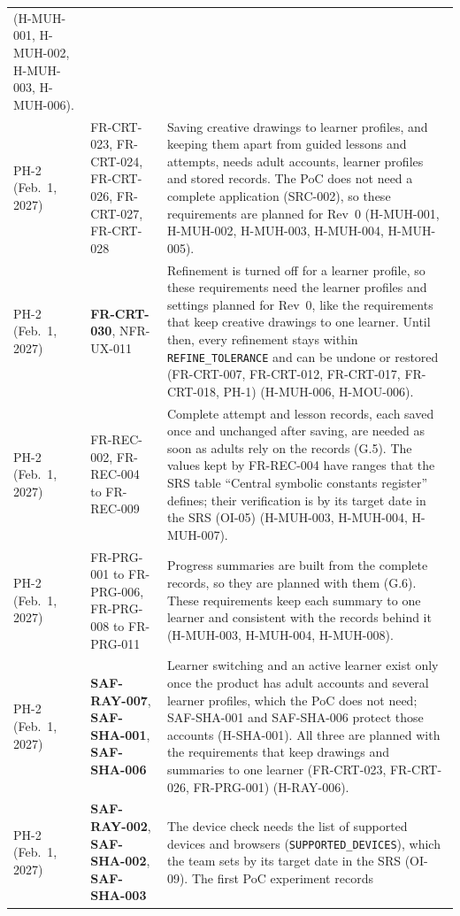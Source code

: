 \documentclass{article}
\begin{document}
{\begin{longtable}{@{}
  >{\raggedright\arraybackslash}p{1.7cm} >{\raggedright\arraybackslash}p{2.4cm}
  >{\raggedright\arraybackslash}p{\dimexpr\linewidth-4.1cm-4\tabcolsep\relax}
  @{}}
(H-MUH-001, H-MUH-002, H-MUH-003, H-MUH-006). \\
\addlinespace
PH-2 (Feb.~1, 2027) & FR-CRT-023, FR-CRT-024, FR-CRT-026, FR-CRT-027, FR-CRT-028
& Saving creative drawings to learner profiles, and keeping them apart from
guided lessons and attempts, needs adult accounts, learner profiles and stored
records. The PoC does not need a complete application (SRC-002), so these
requirements are planned for Rev~0 (H-MUH-001, H-MUH-002, H-MUH-003, H-MUH-004,
H-MUH-005). \\
\addlinespace
PH-2 (Feb.~1, 2027) & \textbf{FR-CRT-030}, NFR-UX-011 & Refinement is turned off for a
learner profile, so these requirements need the learner profiles and settings
planned for Rev~0, like the requirements that keep creative drawings to one
learner. Until then, every refinement stays within \texttt{REFINE\_TOLERANCE}
and can be undone or restored (FR-CRT-007, FR-CRT-012, FR-CRT-017, FR-CRT-018,
PH-1) (H-MUH-006, H-MOU-006). \\
\addlinespace
PH-2 (Feb.~1, 2027) & FR-REC-002, FR-REC-004 to FR-REC-009 & Complete attempt
and lesson records, each saved once and unchanged after saving, are needed as
soon as adults rely on the records (G.5). The values kept by FR-REC-004 have
ranges that the SRS table ``Central symbolic constants register'' defines; their
verification is by its target date in the SRS (OI-05) (H-MUH-003, H-MUH-004, H-MUH-007). \\
\addlinespace
PH-2 (Feb.~1, 2027) & FR-PRG-001 to FR-PRG-006, FR-PRG-008 to FR-PRG-011 &
Progress summaries are built from the complete records, so they are planned with
them (G.6). These requirements keep each summary to one learner and consistent
with the records behind it (H-MUH-003, H-MUH-004, H-MUH-008). \\
\addlinespace
PH-2 (Feb.~1, 2027) & \textbf{SAF-RAY-007}, \textbf{SAF-SHA-001}, \textbf{SAF-SHA-006} & Learner switching
and an active learner exist only once the product has adult accounts and
several learner profiles, which the PoC does not need; SAF-SHA-001 and
SAF-SHA-006 protect those accounts (H-SHA-001). All three are planned with the
requirements that keep drawings and summaries to one learner (FR-CRT-023,
FR-CRT-026, FR-PRG-001) (H-RAY-006). \\
\addlinespace
PH-2 (Feb.~1, 2027) & \textbf{SAF-RAY-002}, \textbf{SAF-SHA-002}, \textbf{SAF-SHA-003} & The device check
needs the list of supported devices and browsers (\texttt{SUPPORTED\_DEVICES}),
which the team sets by its target date in the SRS (OI-09). The first PoC experiment records

\end{longtable}}
\end{document}

